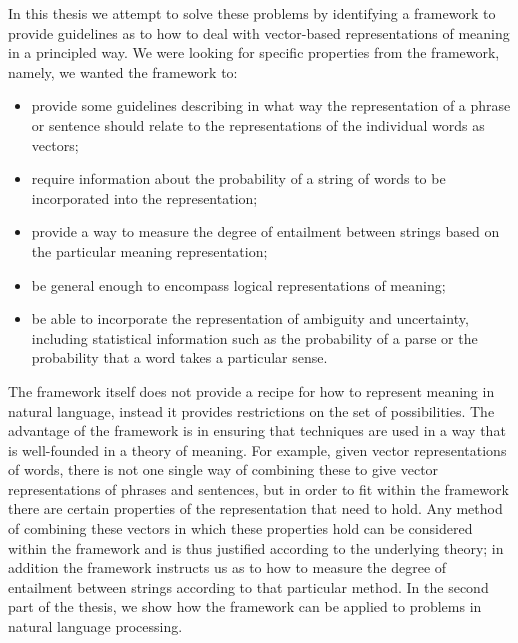 In this thesis we attempt to solve these problems by identifying a framework to provide guidelines as to how to deal with vector-based representations of meaning in a principled way. We were looking for specific properties from the framework, namely, we wanted the framework to:
\begin{itemize}
\item provide some guidelines describing in what way the representation of a phrase or sentence should relate to the representations of the individual words as vectors;
\item require information about the probability of a string of words to be incorporated into the representation;
\item provide a way to measure the degree of entailment between strings based on the particular meaning representation;
\item be general enough to encompass logical representations of meaning;
\item be able to incorporate the representation of ambiguity and uncertainty, including statistical information such as the probability of a parse or the probability that a word takes a particular sense.
\end{itemize}
The framework itself does not provide a recipe for how to represent meaning in natural language, instead it provides restrictions on the set of possibilities. The advantage of the framework is in ensuring that techniques are used in a way that is well-founded in a theory of meaning. For example, given vector representations of words, there is not one single way of combining these to give vector representations of phrases and sentences, but in order to fit within the framework there are certain properties of the representation that need to hold. Any method of combining these vectors in which these properties hold can be considered within the framework and is thus justified according to the underlying theory; in addition the framework instructs us as to how to measure the degree of entailment between strings according to that particular method. In the second part of the thesis, we show how the framework can be applied to problems in natural language processing.

